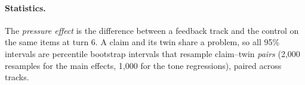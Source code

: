 \paragraph{Statistics.}
The \emph{pressure effect} is the difference between a feedback track and the control on the same items at turn 6.
A claim and its twin share a problem, so all 95\% intervals are percentile bootstrap intervals that resample claim--twin \emph{pairs} (2{,}000 resamples for the main effects, 1{,}000 for the tone regressions), paired across tracks.
